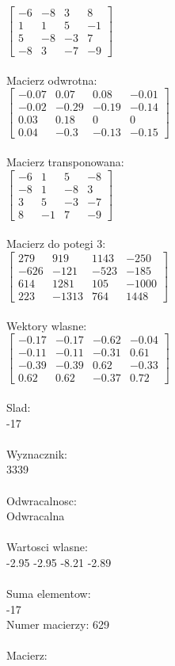\documentclass[a4paper,12pt]{article}
\begin{document}
$\begin{bmatrix} -6&-8&3&8\\1&1&5&-1\\5&-8&-3&7\\-8&3&-7&-9 \end{bmatrix}$
\\
\\
Macierz odwrotna:\\

$\begin{bmatrix} -0.07&0.07&0.08&-0.01\\-0.02&-0.29&-0.19&-0.14\\0.03&0.18&0&0\\0.04&-0.3&-0.13&-0.15 \end{bmatrix}$
\\
\\
Macierz transponowana:\\

$\begin{bmatrix} -6&1&5&-8\\-8&1&-8&3\\3&5&-3&-7\\8&-1&7&-9 \end{bmatrix}$
\\
\\
Macierz do potegi 3:\\

$\begin{bmatrix} 279&919&1143&-250\\-626&-121&-523&-185\\614&1281&105&-1000\\223&-1313&764&1448 \end{bmatrix}$
\\
\\
Wektory wlasne:\\

$\begin{bmatrix} -0.17&-0.17&-0.62&-0.04\\-0.11&-0.11&-0.31&0.61\\-0.39&-0.39&0.62&-0.33\\0.62&0.62&-0.37&0.72 \end{bmatrix}$
\\
\\
Slad:\\
-17
\\
\\
Wyznacznik:\\
3339
\\
\\
Odwracalnosc:\\
Odwracalna
\\
\\
Wartosci wlasne:\\
-2.95 -2.95 -8.21 -2.89
\\
\\
Suma elementow:\\
-17
\\
\newpage
Numer macierzy:
629
\\
\\
Macierz:\\
\end{document}
